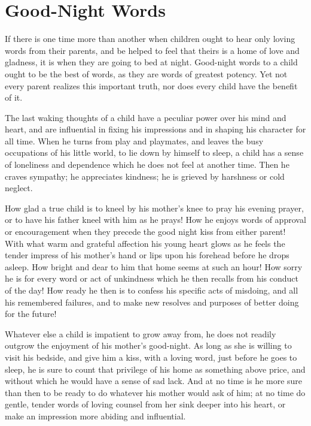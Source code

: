 \documentclass[
]{book}
\begin{document}
\hypertarget{good-night-words}{%
\chapter{Good-Night Words}\label{good-night-words}}

If there is one time more than another when children ought to hear only loving words from their parents, and be helped to feel that theirs is a home of love and gladness, it is when they are going to bed at night. Good-night words to a child ought to be the best of words, as they are words of greatest potency. Yet not every parent realizes this important truth, nor does every child have the benefit of it.

The last waking thoughts of a child have a peculiar power over his mind and heart, and are influential in fixing his impressions and in shaping his character for all time. When he turns from play and playmates, and leaves the busy occupations of his little world, to lie down by himself to sleep, a child has a sense of loneliness and dependence which he does not feel at another time. Then he craves sympathy; he appreciates kindness; he is grieved by harshness or cold neglect.

How glad a true child is to kneel by his mother's knee to pray his evening prayer, or to have his father kneel with him as he prays! How he enjoys words of approval or encouragement when they precede the good night kiss from either parent! With what warm and grateful affection his young heart glows as he feels the tender impress of his mother's hand or lips upon his forehead before he drops asleep. How bright and dear to him that home seems at such an hour! How sorry he is for every word or act of unkindness which he then recalls from his conduct of the day! How ready he then is to confess his specific acts of misdoing, and all his remembered failures, and to make new resolves and purposes of better doing for the future!

Whatever else a child is impatient to grow away from, he does not readily outgrow the enjoyment of his mother's good-night. As long as she is willing to visit his bedside, and give him a kiss, with a loving word, just before he goes to sleep, he is sure to count that privilege of his home as something above price, and without which he would have a sense of sad lack. And at no time is he more sure than then to be ready to do whatever his mother would ask of him; at no time do gentle, tender words of loving counsel from her sink deeper into his heart, or make an impression more abiding and influential.
\end{document}
